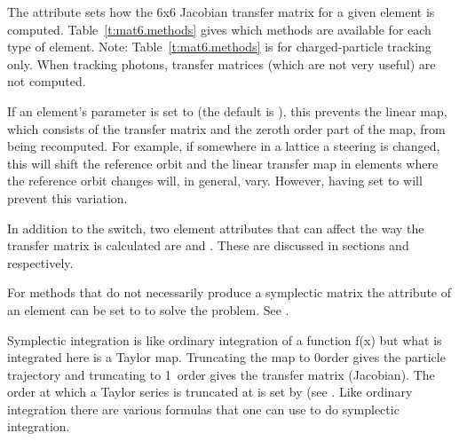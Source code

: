 The  attribute sets how the 6x6 Jacobian transfer matrix for a given element is
computed. Table~\ref{t:mat6.methods} gives which methods are available for each type of element.
Note: Table~\ref{t:mat6.methods} is for charged-particle tracking only. When tracking photons,
transfer matrices (which are not very useful) are not computed.

If an element's  parameter is set to  (the default is ),
this prevents the linear map, which consists of the transfer matrix and the zeroth order part of the
map, from being recomputed. For example, if somewhere in a lattice a steering is changed, this will
shift the reference orbit and the linear transfer map in elements where the reference orbit changes
will, in general, vary. However, having  set to  will prevent this
variation.

In addition to the  switch, two element attributes that can affect the way the
transfer matrix is calculated are  and . These are
discussed in sections  and  respectively.

For methods that do not necessarily produce a symplectic matrix the  attribute of an
element can be set to  to solve the problem. See .

Symplectic integration is like ordinary integration of a function f(x) but what is integrated here
is a Taylor map. Truncating the map to 0\Th order gives the particle trajectory and truncating to
1\St\ order gives the transfer matrix (Jacobian).  The order at which a Taylor series is truncated
at is set by  (see . Like ordinary integration there are various
formulas that one can use to do symplectic integration.

